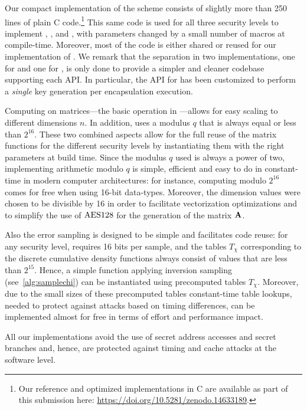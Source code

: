 Our compact implementation of the \FrodoKEM scheme consists of slightly more than 250 lines of plain C code.\footnote{Our reference and optimized implementations in C are available as part of this submission here: \url{https://doi.org/10.5281/zenodo.14633189}.}
This same code is used for all three security levels to implement \FrodoKEMLOne, \FrodoKEMLThree, and \FrodoKEMLFive,
with parameters changed by a small number of macros at compile-time.
Moreover, most of the code is either shared or reused for our implementation of \eFrodoKEM.
We remark that the separation in two implementations, one for \FrodoKEM and one for \eFrodoKEM, is only
done to provide a simpler and cleaner codebase supporting each API. 
In particular, the API for \eFrodoKEM has been customized to perform a \emph{single} key generation
per encapsulation execution.    

Computing on matrices---the basic operation in \FrodoKEM---allows for easy scaling to different dimensions $n$.
In addition, \FrodoKEM uses a modulus $q$ that is always equal or less than $2^{16}$. These two combined
aspects allow for the full reuse of the matrix functions for the different security levels by instantiating them
with the right parameters at build time. Since the modulus $q$ used is always a power of two, implementing
arithmetic modulo $q$ is simple, efficient and easy to do in constant-time in modern computer architectures:
for instance, computing modulo $2^{16}$ comes for free when using 16-bit data-types. Moreover, the dimension
values were chosen to be divisible by 16 in order to facilitate vectorization optimizations and to simplify the
use of $\textrm{\upshape\mdseries AES128}$ for the generation of the matrix $\mathbf{A}$.

Also the error sampling is designed to be simple and facilitates code reuse: for any security level, \FrodoKEM
requires 16 bits per sample, and the tables $T_\chi$ corresponding to the discrete cumulative density functions
always consist of values that are less than $2^{15}$. Hence, a simple function applying inversion sampling
(see~\autoref{alg:samplechi}) can be instantiated using precomputed tables $T_\chi$. Moreover, due to
the small sizes of these precomputed tables constant-time table lookups, needed to protect against attacks
based on timing differences, can be implemented almost for free in terms of effort and performance impact.
\fi

All our implementations avoid the use of secret address accesses and secret branches and, hence,
are protected against timing and cache attacks at the software level.


